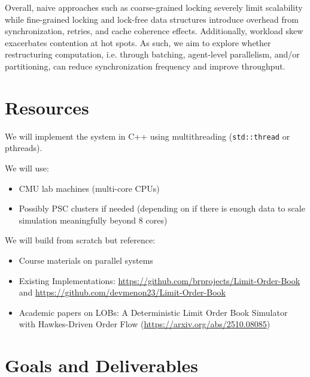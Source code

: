 \documentclass[11pt]{article}
\begin{document}
Overall, naive approaches such as coarse-grained locking severely limit scalability while fine-grained locking and lock-free data structures introduce overhead from synchronization, retries, and cache coherence effects. Additionally, workload skew exacerbates contention at hot spots. As such, we aim to explore whether restructuring computation, i.e. through batching, agent-level parallelism, and/or partitioning, can reduce synchronization frequency and improve throughput.

\section*{Resources}
We will implement the system in C++ using multithreading (\texttt{std::thread} or pthreads).

We will use:
\begin{itemize}
    \item CMU lab machines (multi-core CPUs)
    \item Possibly PSC clusters if needed (depending on if there is enough data to scale simulation meaningfully beyond 8 cores)
\end{itemize}

We will build from scratch but reference:
\begin{itemize}
    \item Course materials on parallel systems
    \item Existing Implementations: \url{https://github.com/brprojects/Limit-Order-Book} and \url{https://github.com/devmenon23/Limit-Order-Book} 
    \item Academic papers on LOBs: A Deterministic Limit Order Book Simulator with Hawkes-Driven Order Flow (\url{https://arxiv.org/abs/2510.08085})
\end{itemize}

\section*{Goals and Deliverables}
\end{document}
